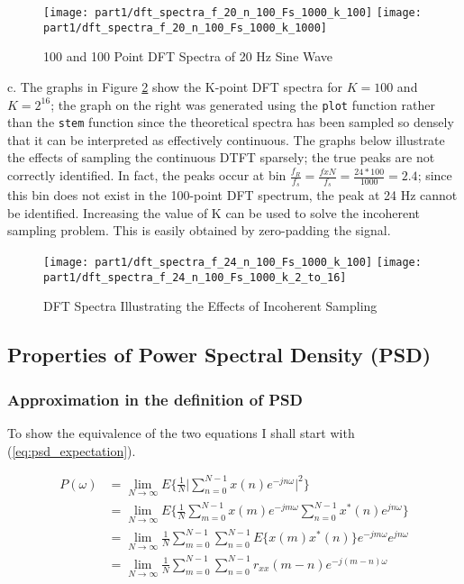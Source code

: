 \begin{figure}[H]
\centering{}
\texttt{[image: part1/dft\_spectra\_f\_20\_n\_100\_Fs\_1000\_k\_100]}
\texttt{[image: part1/dft\_spectra\_f\_20\_n\_100\_Fs\_1000\_k\_1000]}
\caption{100 and 100 Point DFT Spectra of 20 Hz Sine Wave}
\label{fig:dft_spectra_f_20}
\end{figure}

\noindent{}c. The graphs in Figure \ref{fig:incoherent_sampling} show the K-point DFT spectra for $K=100$ and $K=2^{16}$; the graph on the right was generated using the \texttt{plot} function rather than the \texttt{stem} function since the theoretical spectra has been sampled so densely that it can be interpreted as effectively continuous. The graphs below illustrate the effects of sampling the continuous DTFT sparsely; the true peaks are not correctly identified. In fact, the peaks occur at bin $\frac{f_{R}}{f_{s}}=\frac{f x N}{f_{s}}=\frac{24*100}{1000}=2.4$; since this bin does not exist in the 100-point DFT spectrum, the peak at 24 Hz cannot be identified. Increasing the value of K can be used to solve the incoherent sampling problem. This is easily obtained by zero-padding the signal.

\begin{figure}[H]
\centering{}
\texttt{[image: part1/dft\_spectra\_f\_24\_n\_100\_Fs\_1000\_k\_100]}
\texttt{[image: part1/dft\_spectra\_f\_24\_n\_100\_Fs\_1000\_k\_2\_to\_16]}
\caption{DFT Spectra Illustrating the Effects of Incoherent Sampling}
\label{fig:incoherent_sampling}
\end{figure}

\subsection{Properties of Power Spectral Density (PSD)}

\subsubsection*{Approximation in the definition of PSD}

\noindent{}To show the equivalence of the two equations I shall start with (\ref{eq:psd_expectation}).

\begin{align}
P(\omega)	&=\lim_{N \to \infty} E \Bigg\{ \frac{1}{N} \Bigg\lvert\sum_{n=0}^{N-1} x(n)e^{-jn\omega}\Bigg\rvert^{2} \Bigg\} \label{eq:psd_expectation} \\
			&=\lim_{N \to \infty} E \Bigg\{ \frac{1}{N} \sum_{m=0}^{N-1} x(m)e^{-jm\omega}\sum_{n=0}^{N-1} x^{*}(n)e^{jn\omega} \Bigg\} \nonumber \\
			&=\lim_{N \to \infty} \frac{1}{N} \sum_{m=0}^{N-1} \sum_{n=0}^{N-1} E \Bigg\{x(m)x^{*}(n)\Bigg\} e^{-jm\omega}e^{jn\omega} \nonumber \\
			&=\lim_{N \to \infty} \frac{1}{N} \sum_{m=0}^{N-1} \sum_{n=0}^{N-1} r_{xx}(m-n) e^{-j(m-n)\omega} \nonumber			
\end{align}

